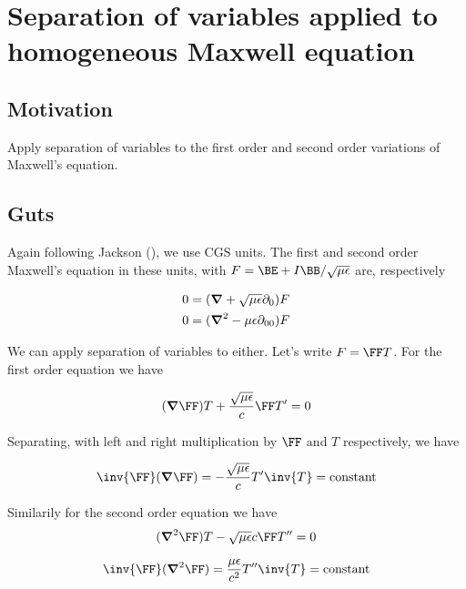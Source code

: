 

\chapter{Separation of variables applied to homogeneous Maxwell equation}
\label{chap:maxwellSepVars}
{}
\date{Aug 9, 2009}

\beginArtWithToc

\section{Motivation}

Apply separation of variables to the first order and second order variations of Maxwell's equation.

\section{Guts}

Again following Jackson (\cite{jackson1975cew}), we use CGS units.  The first and second order Maxwell's equation in these units, with $F = \BE + I\BB/\sqrt{\mu\epsilon}$ are, respectively

\begin{align}\label{eqn:foo1}
0 &= (\boldsymbol{\nabla} + \sqrt{\mu\epsilon} \partial_0) F \\
0 &= (\boldsymbol{\nabla}^2 - {\mu\epsilon} \partial_{00}) F 
\end{align}

We can apply separation of variables to either.  Let's write $F = \FF T$.  For the first order equation we have

\begin{align*}
(\spacegrad \FF) T + \frac{\sqrt{\mu\epsilon}}{c} \FF T' = 0
\end{align*}

Separating, with left and right multiplication by $\FF$ and $T$ respectively, we have

\begin{align}\label{eqn:foo1}
\inv{\FF} (\spacegrad \FF) = -\frac{\sqrt{\mu\epsilon}}{c} T' \inv{T} = \text{constant}
\end{align}

Similarily for the second order equation we have
\begin{align*}
(\spacegrad^2 \FF) T - \sqrt{\mu\epsilon}{c} \FF T'' = 0
\end{align*}

\begin{align}\label{eqn:foo2}
\inv{\FF} (\spacegrad^2 \FF) = \frac{\mu\epsilon}{c^2} T'' \inv{T} = \text{constant}
\end{align}

\EndArticle
